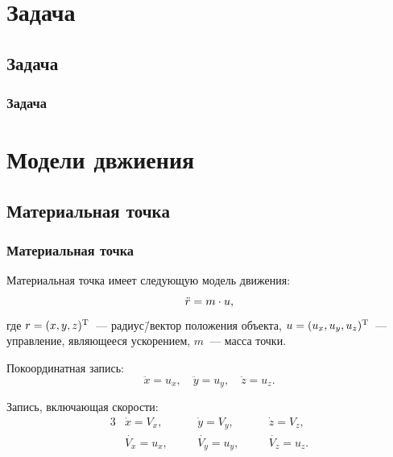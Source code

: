 \documentclass[10pt,t]{beamer}
\begin{document}
%
%
%
%

\section[Задача]{Задача}
\subsection[Задача]{Задача}
\begin{frame}
\frametitle{Задача}
\small



\end{frame}

\section[Модели движения]{Модели двжиения}
\subsection[Материальная точка]{Материальная точка}
\begin{frame}
\frametitle{Материальная точка}
\small

Материальная точка имеет следующую модель движения:
\begin{equation*}
    \Ddot{r} = m \cdot u,
\end{equation*}
где $r = (x, y, z)^\text{\textup{T}}$~--- радиус\=/вектор положения объекта, $u = (u_x, u_y, u_z)^\text{\textup{T}}$~--- управление, являющееся ускорением, $m$~--- масса точки.

Покоординатная запись:
\begin{equation*}
  \ddot{x} = u_x, \quad \ddot{y} = u_y, \quad \ddot{z} = u_z.
\end{equation*}

Запись, включающая скорости:
\begin{alignat*}{3}
  & \dot{x} = V_x,  & \quad & \dot{y} = V_y, & \quad & \dot{z} = V_z, \\
  & \dot{V_x} = u_x, & & \dot{V_y} = u_y, & & \dot{V_z} = u_z.
\end{alignat*}
\end{frame}
\end{document}
